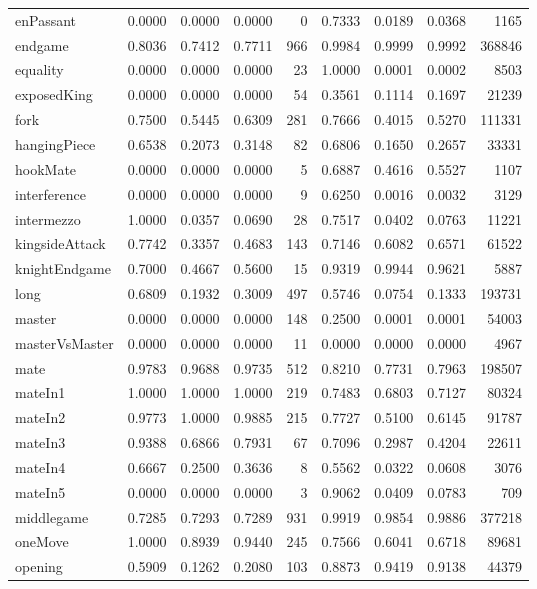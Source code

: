 \begin{table}[H]
\begin{adjustbox}{width=\textwidth}
\begin{tabular}{l|rrrr|rrrr}
      enPassant&0.0000&0.0000&0.0000&0&0.7333&0.0189&0.0368&1165\\
      \rowcolor{lightgray} endgame&0.8036&0.7412&0.7711&966&0.9984&0.9999&0.9992&368846\\
      equality&0.0000&0.0000&0.0000&23&1.0000&0.0001&0.0002&8503\\
      exposedKing&0.0000&0.0000&0.0000&54&0.3561&0.1114&0.1697&21239\\
      fork&0.7500&0.5445&0.6309&281&0.7666&0.4015&0.5270&111331\\
      hangingPiece&0.6538&0.2073&0.3148&82&0.6806&0.1650&0.2657&33331\\
      hookMate&0.0000&0.0000&0.0000&5&0.6887&0.4616&0.5527&1107\\
      interference&0.0000&0.0000&0.0000&9&0.6250&0.0016&0.0032&3129\\
      intermezzo&1.0000&0.0357&0.0690&28&0.7517&0.0402&0.0763&11221\\
      kingsideAttack&0.7742&0.3357&0.4683&143&0.7146&0.6082&0.6571&61522\\
      \rowcolor{lightgray} knightEndgame&0.7000&0.4667&0.5600&15&0.9319&0.9944&0.9621&5887\\
      long&0.6809&0.1932&0.3009&497&0.5746&0.0754&0.1333&193731\\
      master&0.0000&0.0000&0.0000&148&0.2500&0.0001&0.0001&54003\\
      masterVsMaster&0.0000&0.0000&0.0000&11&0.0000&0.0000&0.0000&4967\\
      mate&0.9783&0.9688&0.9735&512&0.8210&0.7731&0.7963&198507\\
      \rowcolor{lightgray} mateIn1&1.0000&1.0000&1.0000&219&0.7483&0.6803&0.7127&80324\\
      \rowcolor{lightgray} mateIn2&0.9773&1.0000&0.9885&215&0.7727&0.5100&0.6145&91787\\
      mateIn3&0.9388&0.6866&0.7931&67&0.7096&0.2987&0.4204&22611\\
      mateIn4&0.6667&0.2500&0.3636&8&0.5562&0.0322&0.0608&3076\\
      mateIn5&0.0000&0.0000&0.0000&3&0.9062&0.0409&0.0783&709\\
      \rowcolor{lightgray} middlegame&0.7285&0.7293&0.7289&931&0.9919&0.9854&0.9886&377218\\
      \rowcolor{lightgray} oneMove&1.0000&0.8939&0.9440&245&0.7566&0.6041&0.6718&89681\\
      opening&0.5909&0.1262&0.2080&103&0.8873&0.9419&0.9138&44379\\

\end{tabular}
\end{adjustbox}
\end{table}
